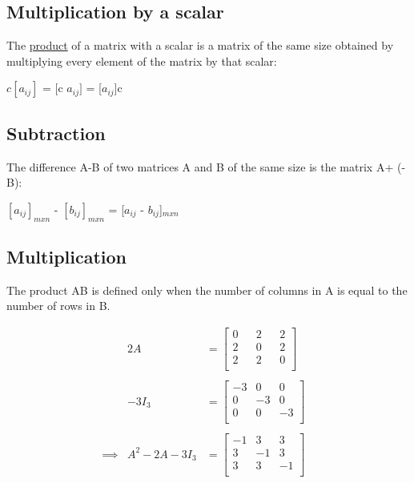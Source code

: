 \documentclass[11pt]{amsbook}
\begin{document}
\subsection{Multiplication by a scalar} The \underline{product} of a matrix with a scalar is a matrix of the same size obtained by multiplying every element of the matrix by that scalar:
\begin{center}
 $c[a_{ij}]$ = [c $a_{ij}]$ = [$a_{ij}$]c
\end{center}

\subsection{Subtraction} The difference A-B of two matrices A and B of the same size is the matrix A+ (- B):
\begin{center}
 $[a_{ij}]_{mxn}$ - $[b_{ij}]_{mxn}$ = [$a_{ij}$ - $b_{ij}$]$_{mxn}$
\end{center}

\subsection{Multiplication} The product AB is defined only when the number of columns in A is equal to the number of rows in B.

\begin{align*}
&&  2A & = 
	\begin{bmatrix}
		0  &&   2    &&  2\\
		2  &&   0    &&   2\\
		2  &&   2    &&  0\\
	\end{bmatrix} 
&&\\
 \\ 
&&  -3I_3 & =
	\begin{bmatrix}
		-3  &   0    &   0\\
		0  &   -3    &   0\\
		0  &   0    &   -3\\
	\end{bmatrix} 
&&
\\
\\
&\implies   &  A^2-2A-3I_3 & = \begin{bmatrix}
-1  &   3    &   3\\
3  &   -1    &   3\\
3 &   3    &   -1\\
\end{bmatrix} 
 \end{align*}
 
\end{document}
